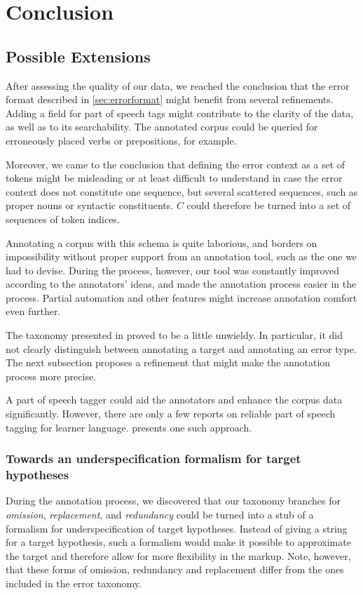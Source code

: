 \documentclass[12pt]{scrartcl}
\begin{document}
\section{Conclusion}

\subsection{Possible Extensions}

After assessing the quality of our data, we reached
the conclusion that the error format described in \ref{sec:errorformat}
might benefit from several refinements. Adding a field for part of speech tags
might contribute to the clarity of the data, as well as to its searchability.
The annotated corpus could be queried for erroneously placed verbs or
prepositions, for example.

Moreover, we came to the conclusion that defining the error context as a set of
tokens might be misleading or at least difficult to understand in case the error
context does not constitute one sequence, but several scattered sequences, such
as proper nouns or syntactic constituents. $C$ could therefore be turned into a
set of sequences of token indices.

Annotating a corpus with this schema is quite laborious, and borders on
impossibility without proper support from an annotation tool, such as the one we
had to devise. During the process, however, our tool was constantly improved
according to the annotators' ideas, and made the annotation process easier in
the process. Partial automation and other features might increase annotation
comfort even further.

The taxonomy presented in \label{taxonomy} proved to be a little unwieldy. In
particular, it did not clearly distinguish between annotating a target and
annotating an error type. The next subsection proposes a refinement that might
make the annotation process more precise.

A part of speech tagger could aid the annotators and enhance the corpus data
significantly. However, there are only a few reports on reliable part of speech
tagging for learner language. \cite{luedeling} presents one such approach.

\subsubsection{Towards an underspecification formalism for target hypotheses}

During the annotation process, we discovered that our taxonomy branches for
\textit{omission}, \textit{replacement}, and \textit{redundancy} could be turned
into a stub of a formalism for underspecification of target hypotheses. Instead
of giving a string for a target hypothesis, such a formalism would make it
possible to approximate the target and therefore allow for more flexibility in
the markup. Note, however, that these forms of omission, redundancy and
replacement differ from the ones included in the error taxonomy.
\end{document}
